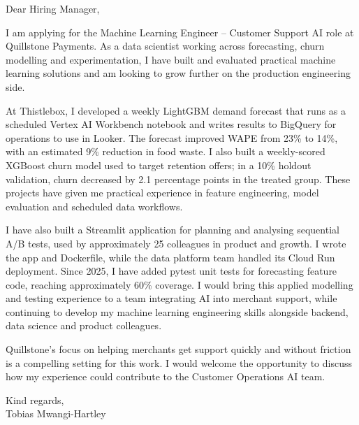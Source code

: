 \documentclass[11pt,a4paper]{article}
\begin{document}
Dear Hiring Manager,

I am applying for the Machine Learning Engineer – Customer Support AI role at Quillstone Payments. As a data scientist working across forecasting, churn modelling and experimentation, I have built and evaluated practical machine learning solutions and am looking to grow further on the production engineering side.

At Thistlebox, I developed a weekly LightGBM demand forecast that runs as a scheduled Vertex AI Workbench notebook and writes results to BigQuery for operations to use in Looker. The forecast improved WAPE from 23\% to 14\%, with an estimated 9\% reduction in food waste. I also built a weekly-scored XGBoost churn model used to target retention offers; in a 10\% holdout validation, churn decreased by 2.1 percentage points in the treated group. These projects have given me practical experience in feature engineering, model evaluation and scheduled data workflows.

I have also built a Streamlit application for planning and analysing sequential A/B tests, used by approximately 25 colleagues in product and growth. I wrote the app and Dockerfile, while the data platform team handled its Cloud Run deployment. Since 2025, I have added pytest unit tests for forecasting feature code, reaching approximately 60\% coverage. I would bring this applied modelling and testing experience to a team integrating AI into merchant support, while continuing to develop my machine learning engineering skills alongside backend, data science and product colleagues.

Quillstone’s focus on helping merchants get support quickly and without friction is a compelling setting for this work. I would welcome the opportunity to discuss how my experience could contribute to the Customer Operations AI team.

Kind regards,\\
Tobias Mwangi-Hartley
\end{document}
